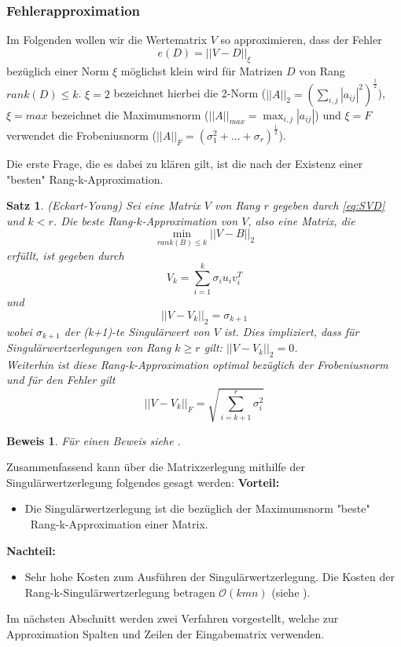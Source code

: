 \documentclass[12pt,a4paper,twoside]{article}
\newtheorem{Satz}{Satz}[section]
\newtheorem{Beweis}{Beweis}
\begin{document}
		\subsubsection{Fehlerapproximation}
		Im Folgenden wollen wir die Wertematrix $V$ so approximieren, dass der Fehler 
		\begin{equation*}
			e(D)=||V-D||_\xi
		\end{equation*}
		bezüglich einer Norm $\xi$ möglichst klein wird für Matrizen $D$ von Rang $rank(D)\leq k$. $\xi=2$ bezeichnet hierbei die 2-Norm ($||A||_2=\left(\sum_{i,j}|a_{ij}|^2\right)^\frac{1}{2}$), $\xi=max$ bezeichnet die Maximumsnorm ($||A||_{max}=\max_{i,j}|a_{ij}|$) und $\xi=F$ verwendet die Frobeniusnorm ($||A||_F=(\sigma_1^2+...+\sigma_r)^\frac{1}{2}$).
		\newline

		Die erste Frage, die es dabei zu klären gilt, ist die nach der Existenz einer  "besten" Rang-k-Approximation.
		\begin{Satz}{(Eckart-Young)}
			Sei eine Matrix $V$ von Rang $r$ gegeben durch \ref{eq:SVD} und $k<r$. Die beste Rang-$k$-Approximation 
			von $V$, also eine Matrix, die
			\begin{equation*}
				\min_{rank(B)\leq k}||V-B||_2	
			\end{equation*}		
			erfüllt, ist gegeben durch
			\begin{equation*}
				 V_k=\sum_{i=1}^k\sigma_i u_i v_i^T
			\end{equation*}
			und 
			\begin{equation*}
				||V-V_k||_2=\sigma_{k+1}
			\end{equation*}
			wobei $\sigma_{k+1}$ der (k+1)-te Singulärwert von $V$ ist. Dies impliziert, dass für Singulärwertzerlegungen von Rang $k\geq r$ gilt: $||V-V_k||_2=0$. \\
			Weiterhin ist diese Rang-k-Approximation optimal bezüglich der Frobeniusnorm und für den Fehler gilt
			\begin{equation*}
				||V-V_k||_F=\sqrt{\sum_{i=k+1}^r\sigma_i^2}		
			\end{equation*}
		\end{Satz}
		\begin{Beweis}
			Für einen Beweis siehe \cite{Golub2013}.
		\end{Beweis}
		Zusammenfassend kann über die Matrixzerlegung mithilfe der Singulärwertzerlegung folgendes gesagt werden: \newline
		\newline
		\textbf{Vorteil:}
		\begin{itemize}
			\item Die Singulärwertzerlegung ist die bezüglich der Maximumsnorm "beste" \ Rang-k-Approximation einer Matrix.
\end{itemize}	
\newpage	
		\textbf{Nachteil:} 
		\begin{itemize}
			\item Sehr hohe Kosten zum Ausführen der Singulärwertzerlegung. Die Kosten der Rang-k-Singulärwertzerlegung betragen $\mathcal{O}(kmn)$ (siehe \citep{Drineas2006}).
		\end{itemize}
		Im nächsten Abschnitt werden zwei Verfahren vorgestellt, welche zur Approximation Spalten und Zeilen der 
		Eingabematrix verwenden.
\end{document}
